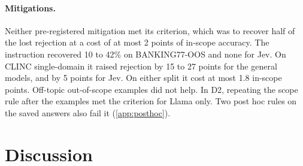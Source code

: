 \documentclass[11pt]{article}
\begin{document}
\paragraph{Mitigations.} Neither pre-registered mitigation met its criterion, which was to recover half of the lost rejection at a cost of at most 2 points of in-scope accuracy. The instruction recovered 10 to 42\% on BANKING77-OOS and none for Jev. On CLINC single-domain it raised rejection by 15 to 27 points for the general models, and by 5 points for Jev. On either split it cost at most 1.8 in-scope points. Off-topic out-of-scope examples did not help. In D2, repeating the scope rule after the examples met the criterion for Llama only. Two post hoc rules on the saved answers also fail it (\cref{app:posthoc}).

\section{Discussion}
\end{document}
